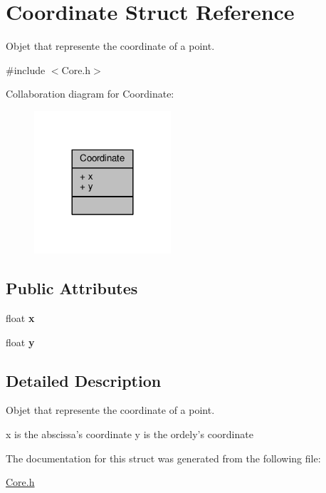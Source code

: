 \hypertarget{structCoordinate}{\section{Coordinate Struct Reference}
\label{structCoordinate}
}


Objet that represente the coordinate of a point.  




{\ttfamily \#include $<$Core.\-h$>$}



Collaboration diagram for Coordinate\-:
\nopagebreak
\begin{figure}[H]
\begin{center}
\leavevmode
\includegraphics[width=144pt]{structCoordinate__coll__graph}
\end{center}
\end{figure}
\subsection*{Public Attributes}
\begin{DoxyCompactItemize}
\item 
\hypertarget{structCoordinate_a514c8968b1d03f65e76c9cc9566ee4cc}{float {\bfseries x}}\label{structCoordinate_a514c8968b1d03f65e76c9cc9566ee4cc}

\item 
\hypertarget{structCoordinate_a1a7d11305e68c5bfba2b9d4569d4b6ef}{float {\bfseries y}}\label{structCoordinate_a1a7d11305e68c5bfba2b9d4569d4b6ef}

\end{DoxyCompactItemize}


\subsection{Detailed Description}
Objet that represente the coordinate of a point. 

x is the abscissa's coordinate y is the ordely's coordinate 

The documentation for this struct was generated from the following file\-:\begin{DoxyCompactItemize}
\item 
\hyperlink{Core_8h}{Core.\-h}\end{DoxyCompactItemize}
